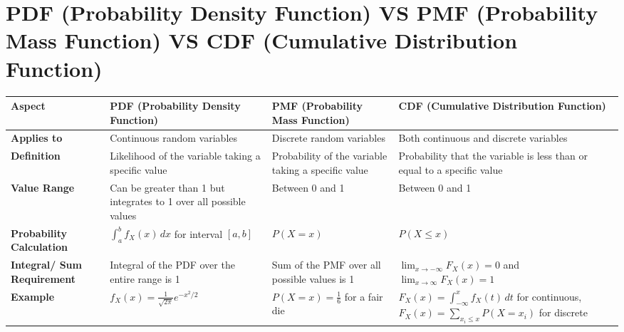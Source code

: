 \section{PDF (Probability Density Function) VS PMF (Probability Mass Function) VS CDF (Cumulative Distribution Function)}\label{PDF (Probability Density Function) VS PMF (Probability Mass Function) VS CDF (Cumulative Distribution Function)}

\begin{table}[H]
    \centering
    \begin{tabular}{| m{2cm} | m{4cm} | m{4cm} | m{4cm} |}
        \hline
        
        \textbf{Aspect} & \textbf{PDF (Probability Density Function)} & \textbf{PMF (Probability Mass Function)} & \textbf{CDF (Cumulative Distribution Function)} \\
        \hline
        
        \textbf{Applies to} & Continuous random variables & Discrete random variables & Both continuous and discrete variables \\
        \hline
        
        \textbf{Definition} & Likelihood of the variable taking a specific value & Probability of the variable taking a specific value & Probability that the variable is less than or equal to a specific value \\
        \hline
        
        \textbf{Value Range} & Can be greater than 1 but integrates to 1 over all possible values & Between 0 and 1 & Between 0 and 1 \\
        \hline
        
        \textbf{Probability Calculation} & \(\int_{a}^{b} f_X(x) \, dx\) for interval \([a, b]\) & \(P(X = x)\) & \(P(X \leq x)\) \\
        \hline
        
        \textbf{Integral/ Sum Requirement} & Integral of the PDF over the entire range is 1 & Sum of the PMF over all possible values is 1 & \(\lim_{x \to -\infty} F_X(x) = 0\) and \(\lim_{x \to \infty} F_X(x) = 1\) \\
        \hline
        
        \textbf{Example} & \(f_X(x) = \frac{1}{\sqrt{2\pi}} e^{-x^2/2}\) & \(P(X = x) = \frac{1}{6}\) for a fair die & \(F_X(x) = \int_{-\infty}^{x} f_X(t) \, dt\) for continuous, \(F_X(x) = \sum_{x_i \leq x} P(X = x_i)\) for discrete \\
        \hline
    \end{tabular}
\end{table}



